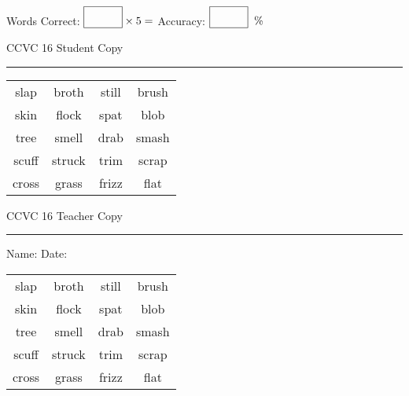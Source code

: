 \documentclass{memoir}
\begin{document}
\normalsize

Words Correct: $\fbox{\phantom{\huge 100}} \times 5 = $ Accuracy: $\fbox{\phantom{\huge 100}}\;\; \%$ 

\vfill

\newpage


\footnotesize \noindent
CCVC 16 \hfill Student Copy
\smallskip
\hrule

\Large

\setlength{\tabcolsep}{14pt}
\def\arraystretch{3}

{\selectfont


\begin{vplace}[0.5]
\begin{center}
\begin{tabular}{cccc}
slap            & broth    & still & brush \\
skin & flock & spat            & blob \\
tree & smell & drab             & smash \\
scuff & struck & trim & scrap \\
cross & grass                    & frizz & flat             \\
\end{tabular}
\end{center}
\end{vplace}

}

\newpage

\footnotesize \noindent
CCVC 16 \hfill Teacher Copy
\smallskip
\hrule

\normalsize

\vfill

\noindent
Name: \underline{\hspace{1.75in}} \hfill Date: \underline{\hspace{1in}}

\Large

{\selectfont


\begin{vplace}[0.5]
\begin{center}
\begin{tabular}{cccc}
slap            & broth    & still & brush \\
skin & flock & spat            & blob \\
tree & smell & drab             & smash \\
scuff & struck & trim & scrap \\
cross & grass                    & frizz & flat             \\
\end{tabular}
\end{center}
\end{vplace}



}
\end{document}
